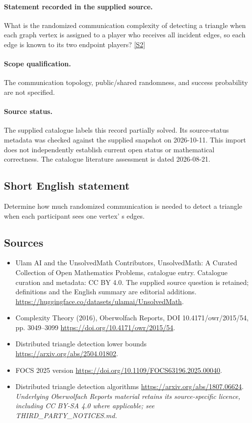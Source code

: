 \documentclass[11pt]{article}
\begin{document}
\paragraph{Statement recorded in the supplied source.}
What is the randomized communication complexity of detecting a triangle when each graph vertex is assigned to a player who receives all incident edges, so each edge is known to its two endpoint players? \href{https://doi.org/10.4171/owr/2015/54}{[S2]}
\paragraph{Scope qualification.}
The communication topology, public/shared randomness, and success probability are not specified.
\paragraph{Source status.}
The supplied catalogue labels this record partially solved. Its source-status metadata was checked against the supplied snapshot on 2026-10-11. This import does not independently establish current open status or mathematical correctness. The catalogue literature assessment is dated 2026-08-21.
\subsection{Short English statement}
Determine how much randomized communication is needed to detect a triangle when each participant sees one vertex' s edges.
\subsection{Sources}
\begin{itemize}
\item[S1] Ulam AI and the UnsolvedMath Contributors, UnsolvedMath: A Curated Collection of Open Mathematics Problems, catalogue entry. Catalogue curation and metadata: CC BY 4.0. The supplied source question is retained; definitions and the English summary are editorial additions.
\url{https://huggingface.co/datasets/ulamai/UnsolvedMath}.
\item[S2] Complexity Theory (2016), Oberwolfach Reports, DOI 10.4171/owr/2015/54, pp. 3049--3099
\url{https://doi.org/10.4171/owr/2015/54}.
\item[S3] Distributed triangle detection lower bounds
\url{https://arxiv.org/abs/2504.01802}.
\item[S4] FOCS 2025 version
\url{https://doi.org/10.1109/FOCS63196.2025.00040}.
\item[S5] Distributed triangle detection algorithms
\url{https://arxiv.org/abs/1807.06624}.
\textit{Underlying Oberwolfach Reports material retains its source-specific licence, including CC BY-SA 4.0 where applicable; see THIRD\_PARTY\_NOTICES.md.}
\end{itemize}
\end{document}
